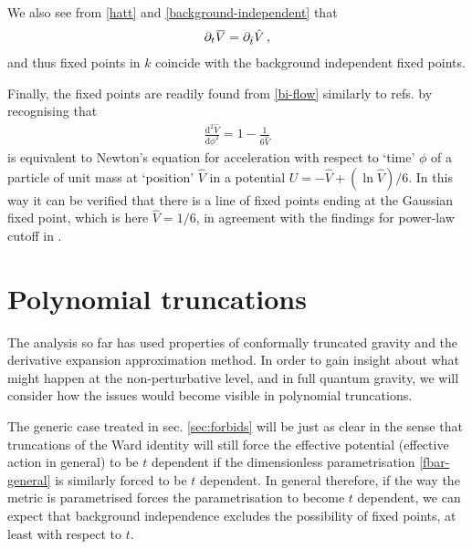 \documentclass[11pt]{book} %
\newcommand{\overbar}[1]{\mkern 1.5mu\overline{\mkern-1.5mu#1\mkern-1.5mu}\mkern 1.5mu}
\newcommand{\bV}{\overbar V}
\newcommand{\hV}{\hat V}
\newcommand{\hatt}{\hat t}
\numberwithin{equation}{chapter}
\begin{document}
We also see from \eqref{hatt} and \eqref{background-independent} that
\begin{align}
  \partial_t \bV = \partial_{\hatt} \hV\,,
\end{align}
and thus fixed points in $k$ coincide with the background independent fixed points.

Finally, the fixed points are readily found from \eqref{bi-flow} similarly to refs.
\cite{Dietz:2016gzg,Morris:1994jc} by recognising that
\begin{align}
  \frac{\mathrm d^2\hV}{\mathrm d\phi^2} = 1-\frac{1}{6\hV}
\end{align}
is equivalent to Newton's equation for acceleration with respect to `time' $\phi$ of a particle
of unit mass at `position' $\hV$ in a potential $U=-\hV+ (\ln\hV)/6$.
In this way it can be verified that there is a line of fixed points ending at the Gaussian fixed point,
which is here $\hV=1/6$, in agreement with the findings for power-law cutoff in \cite{Dietz:2016gzg}.


\section{Polynomial truncations}
\label{sec:truncations}

The analysis  so far has used properties of conformally truncated gravity and the derivative
expansion approximation method. In order to gain insight about what might happen at the non-perturbative level,
and in full quantum gravity, we will consider how the issues would become visible in polynomial truncations.

The generic case treated in sec. \ref{sec:forbids} will be just as clear in the sense that truncations
of the Ward identity will still force the effective potential (effective action in general) to be
$t$ dependent if the dimensionless parametrisation \eqref{fbar-general} is similarly forced to be $t$ dependent.
In general therefore, if the way the metric is parametrised forces the parametrisation to become $t$ dependent,
we can expect that background independence excludes the possibility of fixed points,
at least with respect to $t$.
\end{document}

